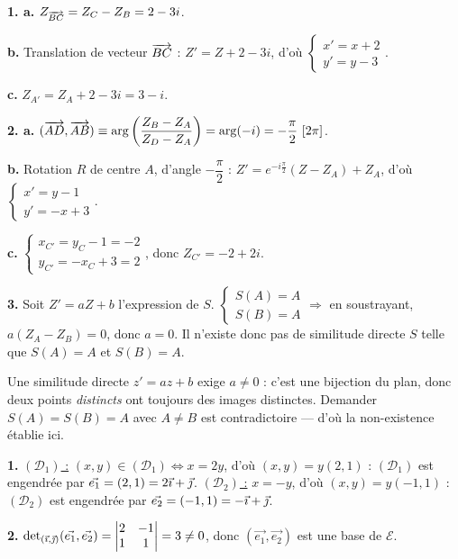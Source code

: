 \documentclass[11pt]{article}
\begin{document}

\textbf{1. a.} $Z_{\overrightarrow{BC}} = Z_C - Z_B = 2 - 3i$.

\textbf{b.} Translation de vecteur $\overrightarrow{BC}$ : $Z' = Z + 2 - 3i$, d'où $\begin{cases} x' = x + 2 \\ y' = y - 3 \end{cases}$.

\textbf{c.} $Z_{A'} = Z_A + 2 - 3i = 3 - i$.

\textbf{2. a.} $(\overrightarrow{AD}, \overrightarrow{AB}) \equiv \arg\left(\dfrac{Z_B - Z_A}{Z_D - Z_A}\right) = \arg(-i) = -\dfrac{\pi}{2}\ [2\pi]$.

\textbf{b.} Rotation $R$ de centre $A$, d'angle $-\dfrac{\pi}{2}$ : $Z' = e^{-i\frac{\pi}{2}}(Z - Z_A) + Z_A$, d'où $\begin{cases} x' = y - 1 \\ y' = -x + 3 \end{cases}$.

\textbf{c.} $\begin{cases} x_{C'} = y_C - 1 = -2 \\ y_{C'} = -x_C + 3 = 2 \end{cases}$, donc $Z_{C'} = -2 + 2i$.

\textbf{3.} Soit $Z' = aZ + b$ l'expression de $S$. $\begin{cases} S(A) = A \\ S(B) = A \end{cases} \Rightarrow$ en soustrayant, $a(Z_A - Z_B) = 0$, donc $a = 0$. Il n'existe donc pas de similitude directe $S$ telle que $S(A) = A$ et $S(B) = A$.

\begin{rappel}
Une similitude directe $z' = az + b$ exige $a \ne 0$ : c'est une
bijection du plan, donc deux points \emph{distincts} ont toujours des
images distinctes. Demander $S(A) = S(B) = A$ avec $A \ne B$ est
contradictoire — d'où la non-existence établie ici.
\end{rappel}

\textbf{1.} \underline{$(\mathcal{D}_1)$ :} $(x,y) \in (\mathcal{D}_1) \Leftrightarrow x = 2y$, d'où $(x,y) = y(2,1)$ : $(\mathcal{D}_1)$ est engendrée par $\vec{e_1} = (2,1) = 2\vec{\imath} + \vec{\jmath}$. \underline{$(\mathcal{D}_2)$ :} $x = -y$, d'où $(x,y) = y(-1,1)$ : $(\mathcal{D}_2)$ est engendrée par $\vec{e_2} = (-1,1) = -\vec{\imath} + \vec{\jmath}$.

\textbf{2.} $\det_{(\vec{\imath},\vec{\jmath})}(\vec{e_1}, \vec{e_2}) = \begin{vmatrix} 2 & -1 \\ 1 & 1 \end{vmatrix} = 3 \ne 0$, donc $(\vec{e_1}, \vec{e_2})$ est une base de $\mathscr{E}$.
\end{document}
